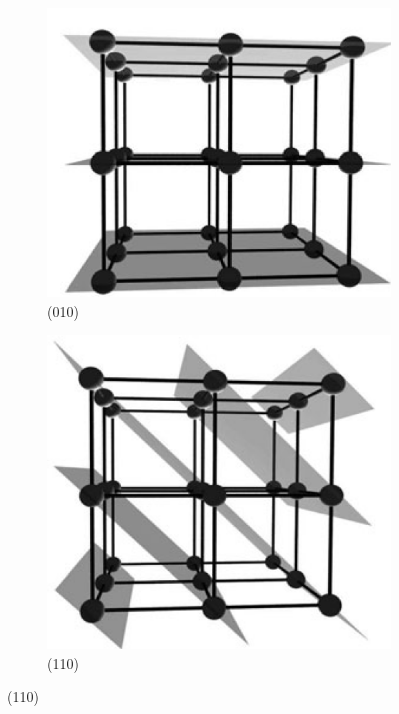 \begin{figure}[h!] \centering
	\begin{subfigure}{0.3\linewidth} \centering
		\includegraphics[scale=0.27]{Cuerpo/Ch_02/010.png}
		\caption{(010)}
	\end{subfigure}
	\begin{subfigure}{0.3\linewidth} \centering
	\includegraphics[scale=0.27]{Cuerpo/Ch_02/110.png}
	\caption{(110)}
	\end{subfigure}

\end{figure}
